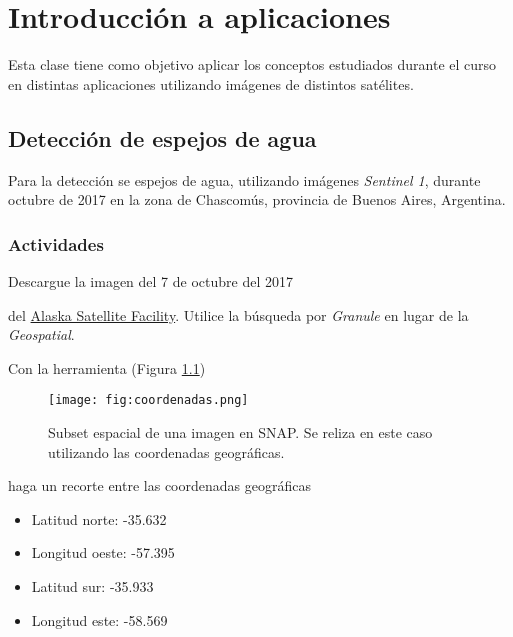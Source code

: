\chapter{Introducción a aplicaciones}
Esta clase tiene como objetivo aplicar los conceptos estudiados durante el curso en distintas aplicaciones utilizando imágenes de distintos satélites.

\section{Detección de espejos de agua}

Para la detección se espejos de agua, utilizando imágenes \emph{Sentinel 1}, durante octubre de 2017 en la zona de Chascomús, provincia de Buenos Aires, Argentina.



\subsection{Actividades}

\begin{que}
    Descargue la imagen del 7 de octubre del 2017
    \begin{center}\end{center} del \href{https://vertex.daac.asf.alaska.edu/}{Alaska Satellite Facility}. Utilice la búsqueda por \emph{Granule} en lugar de la \emph{Geospatial}.
\end{que}

\begin{que}
    Con la herramienta  (Figura \ref{fig:coordenadas})
    \begin{figure}[h!]
        \centering
        \texttt{[image: fig:coordenadas.png]}
        \caption{Subset espacial de una imagen en SNAP. Se reliza en este caso utilizando las coordenadas geográficas.}
        \label{fig:coordenadas}
    \end{figure}

    haga un recorte entre las coordenadas geográficas
    \begin{itemize}
        \item Latitud norte: -35.632
        \item Longitud oeste: -57.395
        \item Latitud sur: -35.933
        \item Longitud este: -58.569
    \end{itemize}


\end{que}

